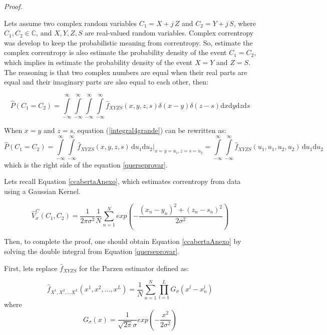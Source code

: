 \documentclass[preprint,12pt]{elsarticle}
\begin{document}
\textit{Proof.}



Lets assume two complex random variables $C_{1}=X+j\,Z$ and  $C_{2} = Y+j\,S$, where $C_{1},C_{2} \in \mathbb{C}$, and $X,Y,Z,S$  are real-valued random variables. Complex correntropy was develop to keep the probabilistic meaning from correntropy. So, estimate the complex correntropy is also estimate the probability density of the event $C_1=C_2$, which implies in estimate the probability density of the event $X=Y$ and $Z=S$. The reasoning is that two complex numbers are equal when their real parts are equal and their imaginary parts are also equal to each other, then:

\begin{equation}\label{integral4grande}
\hat{P}(C_{1} = C_{2}) = \int\limits_{-\infty}^{\infty} \int\limits_{-\infty}^{\infty} \int\limits_{-\infty}^{\infty} \int\limits_{-\infty}^{\infty} \hat{f}_{XYZS}(x,y,z,s) \delta(x-y) \delta(z-s) \mathrm{d}x\mathrm{d}y \mathrm{d}z\mathrm{d}s
\end{equation}

When $x=y$ and $z=s$, equation (\ref{integral4grande}) can be rewritten as:
\small
\begin{equation}\label{p2}
\hat{P}(C_{1} = C_{2}) =\int\limits_{-\infty}^{\infty} \int\limits_{-\infty}^{\infty}  \! \hat{f}_{XYZS}(x,y,z,s) \, \mathrm{d}u_{1}\mathrm{d}u_{2} \Big|_{x=y=u_{1}, z=s=u_{2}} = \int\limits_{-\infty}^{\infty} \int\limits_{-\infty}^{\infty}  \! \hat{f}_{XYZS}(u_{1},u_{1},u_{2},u_{2}) \, \mathrm{d}u_{1}\mathrm{d}u_{2} 
\end{equation}
\normalsize
which is the right side of the equation \ref{querseprovar}.

Lets recall Equation \ref{ccabertaAnexo}, which estimates correntropy from data using a Gaussian Kernel.

\begin{equation}\label{ccabertaAnexo}
\hat{V}^{C}_{\sigma}(C_{1},C_{2}) = \frac{1}{2\pi\sigma^{2}} \frac{1}{N} \sum\limits_{n=1}^N exp \left ( -\frac{(x_{n} - y_{n})^{2} + (z_{n} - s_{n})^{2} }{2\sigma^2} \right ) 
\end{equation}

Then, to complete the proof, one should obtain Equation \ref{ccabertaAnexo} by solving the double integral from Equation \ref{querseprovar}.

First, lets replace $\hat{f}_{XYZS}$ for the Parzen estimator defined as:

\begin{equation}\label{parzenL}
\hat{f}_{X^{1},X^{2},...X^{L}}(x^{1},x^{2},...,x^{L}) = \frac{1}{N}\sum\limits_{n=1}^N \prod \limits_{l=1}^L  G_{\sigma}(x^{l}-x^{l}_{n})
\end{equation}
where
\begin{equation}\nonumber
G_{\sigma}(x) = \frac{1}{\sqrt{2\pi}\sigma}exp \left ( -\frac{x^2}{2\sigma^2} \right )
\end{equation}
\end{document}
